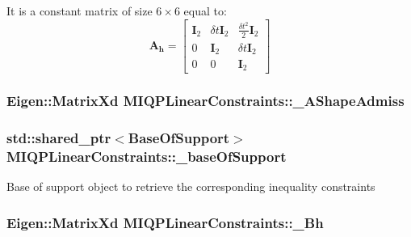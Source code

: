 \-It is a constant matrix of size $6\times6$ equal to\-: \[ \mathbf{A_h} = \left[ \begin{array}{ccc} \mathbf{I}_2 & \delta t \mathbf{I}_2 & \frac{\delta t^2}{2} \mathbf{I}_2 \\ 0 & \mathbf{I}_2 & \delta t \mathbf{I}_2 \\ 0 & 0 & \mathbf{I}_2 \end{array} \right] \] \hypertarget{classMIQPLinearConstraints_a7ff7b3584cf9ff3e2124d80bd0684180}{
\subsubsection[{\-\_\-\-A\-Shape\-Admiss}]{\setlength{\rightskip}{0pt plus 5cm}\-Eigen\-::\-Matrix\-Xd {\bf \-M\-I\-Q\-P\-Linear\-Constraints\-::\-\_\-\-A\-Shape\-Admiss}}}\label{classMIQPLinearConstraints_a7ff7b3584cf9ff3e2124d80bd0684180}
\hypertarget{classMIQPLinearConstraints_a9b26abbc012b0f39c6bef163d9c3faed}{
\subsubsection[{\-\_\-base\-Of\-Support}]{\setlength{\rightskip}{0pt plus 5cm}std\-::shared\-\_\-ptr$<${\bf \-Base\-Of\-Support}$>$ {\bf \-M\-I\-Q\-P\-Linear\-Constraints\-::\-\_\-base\-Of\-Support}}}\label{classMIQPLinearConstraints_a9b26abbc012b0f39c6bef163d9c3faed}
\-Base of support object to retrieve the corresponding inequality constraints \hypertarget{classMIQPLinearConstraints_a0c0fbbb1b86c5d51a133ee661977c1f5}{
\subsubsection[{\-\_\-\-Bh}]{\setlength{\rightskip}{0pt plus 5cm}\-Eigen\-::\-Matrix\-Xd {\bf \-M\-I\-Q\-P\-Linear\-Constraints\-::\-\_\-\-Bh}}}\label{classMIQPLinearConstraints_a0c0fbbb1b86c5d51a133ee661977c1f5}
